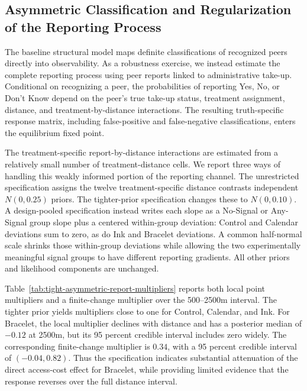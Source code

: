 \documentclass[12pt]{article}
\begin{document}
\providecommand{\StructuralRobustnessPath}{appendix/structural-robustness}

\subsection{Asymmetric Classification and Regularization of the Reporting Process}
\label{app:asymmetric-reporting-priors}

The baseline structural model maps definite classifications of recognized
peers directly into observability. As a robustness exercise, we instead
estimate the complete reporting process using peer reports linked to
administrative take-up. Conditional on recognizing a peer, the probabilities
of reporting Yes, No, or Don't Know depend on the peer's true take-up status,
treatment assignment, distance, and treatment-by-distance interactions. The
resulting truth-specific response matrix, including false-positive and
false-negative classifications, enters the equilibrium fixed point.

The treatment-specific report-by-distance interactions are estimated from a
relatively small number of treatment-distance cells. We report three ways of
handling this weakly informed portion of the reporting channel. The
unrestricted specification assigns the twelve treatment-specific distance
contrasts independent $N(0,0.25)$ priors. The tighter-prior specification
changes these to $N(0,0.10)$. A design-pooled specification instead writes
each slope as a No-Signal or Any-Signal group slope plus a centered
within-group deviation: Control and Calendar deviations sum to zero, as do Ink
and Bracelet deviations. A common half-normal scale shrinks those within-group
deviations while allowing the two experimentally meaningful signal groups to
have different reporting gradients. All other priors and likelihood
components are unchanged.

Table~\ref{tab:tight-asymmetric-report-multipliers} reports both local point
multipliers and a finite-change multiplier over the 500--2500m interval. The
tighter prior yields multipliers close to one for Control, Calendar, and Ink.
For Bracelet, the local multiplier declines with distance and has a posterior
median of $-0.12$ at 2500m, but its 95 percent credible interval includes zero
widely. The corresponding finite-change multiplier is $0.34$, with a 95
percent credible interval of $(-0.04,0.82)$. Thus the specification indicates
substantial attenuation of the direct access-cost effect for Bracelet, while
providing limited evidence that the response reverses over the full distance
interval.
\end{document}
